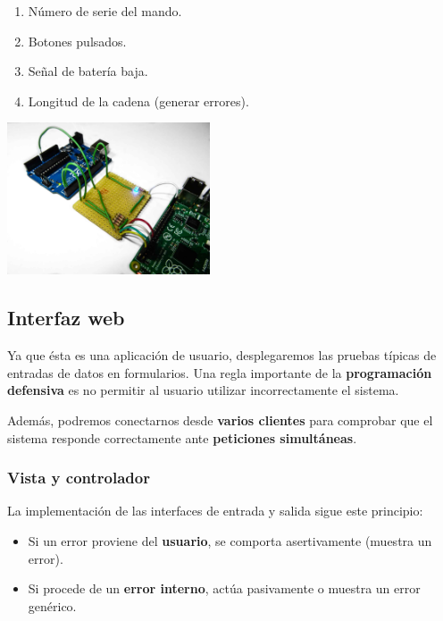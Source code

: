 \documentclass[10pt,a4paper]{article}
\begin{document}
	\begin{multicols}{2}
		\begin{enumerate}
			\item Número de serie del mando.
			\item Botones pulsados.
			\item Señal de batería baja.
			\item Longitud de la cadena (generar errores).
		\end{enumerate}
		\columnbreak
		\begin{center}
			\includegraphics[width=0.45\textwidth]{images/proto_uart} 
		\end{center}
	\end{multicols}

	\subsection{Interfaz web}
	
	Ya que ésta es una aplicación de usuario, desplegaremos las pruebas típicas de entradas de datos en formularios. Una regla importante de la \textbf{programación defensiva} es no permitir al usuario utilizar incorrectamente el sistema.
	
	Además, podremos conectarnos desde \textbf{varios clientes} para comprobar que el sistema responde correctamente ante \textbf{peticiones simultáneas}.
	
	\subsubsection*{Vista y controlador}
	
	La implementación de las interfaces de entrada y salida sigue este principio:
	
	\begin{itemize}
		\item Si un error proviene del \textbf{usuario}, se comporta asertivamente (muestra un error).
		\item Si procede de un \textbf{error interno}, actúa pasivamente o muestra un error genérico.
	\end{itemize}
	
\end{document}

